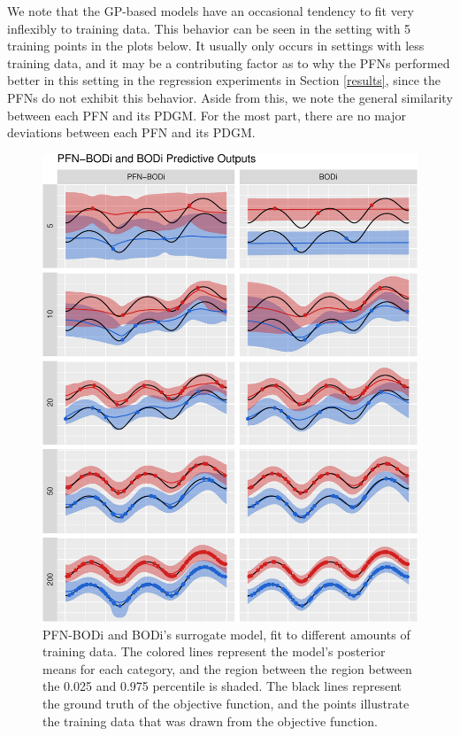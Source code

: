 \documentclass[12pt,twoside]{reedthesis}
\begin{document}
We note that the GP-based models have an occasional tendency to fit very inflexibly to training data. This behavior can be seen in the setting with 5 training points in the plots below. It usually only occurs in settings with less training data, and it may be a contributing factor as to why the PFNs performed better in this setting in the regression experiments in Section \ref{results}, since the PFNs do not exhibit this behavior. Aside from this, we note the general similarity between each PFN and its PDGM. For the most part, there are no major deviations between each PFN and its PDGM.
\begin{figure}
\centering
\includegraphics{thesis_files/figure-latex/exampleModelFitBODi-1.pdf}
\caption{\label{fig:exampleModelFitBODi}PFN-BODi and BODi's surrogate model, fit to different amounts of training data. The colored lines represent the model's posterior means for each category, and the region between the region between the 0.025 and 0.975 percentile is shaded. The black lines represent the ground truth of the objective function, and the points illustrate the training data that was drawn from the objective function.}
\end{figure}
\end{document}
